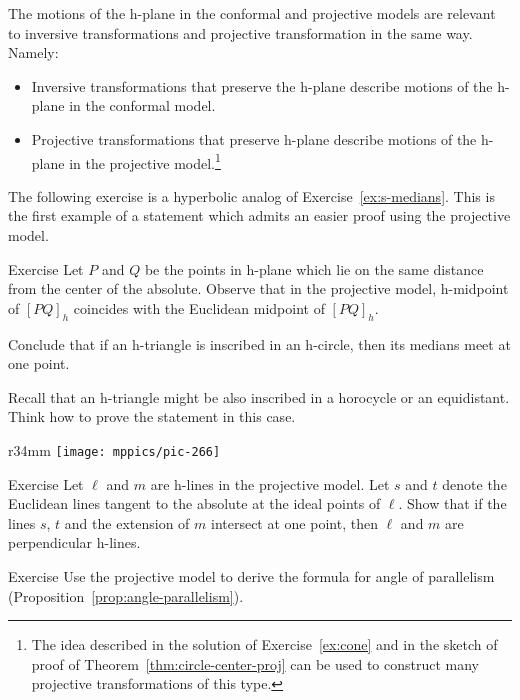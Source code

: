 The motions of the h-plane in the conformal and projective models are relevant to inversive transformations and projective transformation in the same way.
Namely: 
\begin{itemize}
\item Inversive transformations that preserve the h-plane describe motions of the h-plane in the conformal model.
\item Projective transformations that preserve h-plane describe motions of the h-plane in the projective model.\footnote{The idea described in the solution of Exercise~\ref{ex:cone} and in the sketch of proof of Theorem~\ref{thm:circle-center-proj} can be used to construct many projective transformations of this type.}
\end{itemize}

The following exercise is a hyperbolic analog of Exercise~\ref{ex:s-medians}. 
This is the first example of a statement which admits an easier proof using  the projective model.

\begin{thm}{Exercise}\label{ex:h-median}
Let $P$ and $Q$ be the points in h-plane which lie on the same distance from the center of the absolute.
Observe that in the projective model, h-midpoint of $[PQ]_h$ coincides with the Euclidean midpoint of $[PQ]_h$.

Conclude that if an h-triangle is inscribed in an h-circle, then its medians meet at one point.

Recall that an h-triangle might be also inscribed in a horocycle or an equidistant.
Think how to prove the statement in this case.
\end{thm}

{

\begin{wrapfigure}{r}{34mm}
\vskip-6mm
\centering
\texttt{[image: mppics/pic-266]}
\end{wrapfigure}

\begin{thm}{Exercise}\label{ex:klein-perp}
Let $\ell$ and $m$ are  h-lines in the projective model.
Let $s$ and $t$ denote the Euclidean lines tangent to the absolute
at the ideal points of $\ell$. 
Show that 
if the lines $s$, $t$ and the extension of $m$ intersect at one point, then $\ell$ and $m$ are perpendicular h-lines. 
\end{thm}

}

\begin{thm}{Exercise}\label{ex:klein-for-angle-parallelism}
Use the projective model to derive the formula for angle of parallelism  (Proposition~\ref{prop:angle-parallelism}). 
\end{thm}

